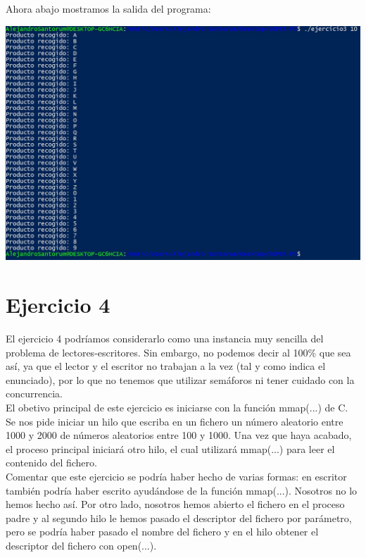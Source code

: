 \documentclass[12pt]{article}
\begin{document}
Ahora abajo mostramos la salida del programa:
\begin{center}
	\includegraphics[scale=0.86]{ej3.JPG}
\end{center}


\section{Ejercicio 4}
El ejercicio 4 podríamos considerarlo como una instancia muy sencilla del problema de lectores-escritores. Sin embargo, no podemos decir al 100\% que sea así, ya que el lector y el escritor no trabajan a la vez (tal y como indica el enunciado), por lo que no tenemos que utilizar semáforos ni tener cuidado con la concurrencia.\\

El obetivo principal de este ejercicio es iniciarse con la función mmap(...) de C.\\

Se nos pide iniciar un hilo que escriba en un fichero un número aleatorio entre 1000 y 2000 de números aleatorios entre 100 y 1000. Una vez que haya acabado, el proceso principal iniciará otro hilo, el cual utilizará mmap(...) para leer el contenido del fichero.\\

Comentar que este ejercicio se podría haber hecho de varias formas: en escritor también podría haber escrito ayudándose de la función mmap(...). Nosotros no lo hemos hecho así. Por otro lado, nosotros hemos abierto el fichero en el proceso padre y al segundo hilo le hemos pasado el descriptor del fichero por parámetro, pero se podría haber pasado el nombre del fichero y en el hilo obtener el descriptor del fichero con open(...).\\
\end{document}
